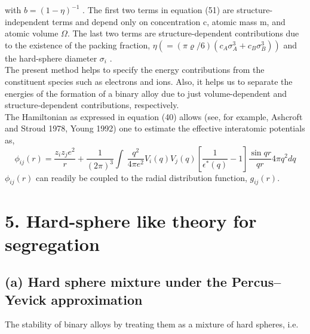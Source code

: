 \documentclass[12pt]{article}
\newcommand*{\1}{\hspace{1pt}}
\begin{document}
with $b = (1 - \eta)^{-1}$ . The first two terms in equation (51) are structure-independent terms and 
depend only on concentration c, atomic mass m, and atomic volume $\Omega $. The last two terms are 
structure-dependent contributions due to the existence of the packing
fraction, $\eta (= (\pi \varrho/6)(c_A\sigma^3_A + c_B\sigma^3_{B})) $ and the hard-sphere diameter $\sigma _{i}$ .\\
    The present method helps to specify the energy contributions from the constituent
species such as electrons and ions. Also, it helps us to separate the energies of the formation
of a binary alloy due to just volume-dependent and structure-dependent contributions,
respectively.\\
The Hamiltonian as expressed in equation (40) allows (see, for example, Ashcroft and Stroud 1978, Young
1992) one to estimate the effective interatomic potentials as,
    \begin{equation}
        \phi _{ij}(r) = \frac{z_{i}z_{j}e^2}{r} + \frac{1}{(2\pi)^3}\int_{}^{}  \,\frac{q^2}{4\pi e^2}V_{i}(q)V_{j}(q)
        \left[\frac{1}{\epsilon ^{\ast}(q) } - 1\right]\frac{\sin qr}{qr} 4\pi q^2 dq 
    \end{equation}
$\phi _{ij}(r)$ can readily be coupled to the radial distribution function, $g_{ij}(r)$.\\

\section*{5. Hard-sphere like theory for segregation}

\subsection*{(a) Hard sphere mixture under the Percus–Yevick approximation}

The stability of binary alloys by treating them as a mixture of hard spheres, i.e.
\end{document}
